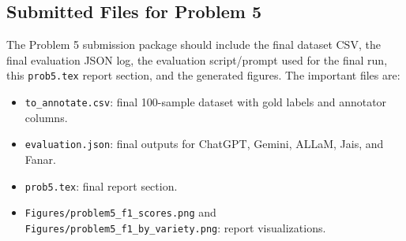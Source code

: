 \subsection{Submitted Files for Problem 5}
The Problem 5 submission package should include the final dataset CSV, the final evaluation JSON log, the evaluation script/prompt used for the final run, this \texttt{prob5.tex} report section, and the generated figures. The important files are:
\begin{itemize}
    \item \texttt{to\_annotate.csv}: final 100-sample dataset with gold labels and annotator columns.
    \item \texttt{evaluation.json}: final outputs for ChatGPT, Gemini, ALLaM, Jais, and Fanar.
    \item \texttt{prob5.tex}: final report section.
    \item \texttt{Figures/problem5\_f1\_scores.png} and \texttt{Figures/problem5\_f1\_by\_variety.png}: report visualizations.
\end{itemize}

\normalfont
\endgroup
